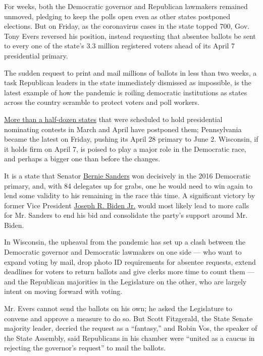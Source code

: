 For weeks, both the Democratic governor and Republican lawmakers
remained unmoved, pledging to keep the polls open even as other states
postponed elections. But on Friday, as the coronavirus cases in the
state topped 700, Gov. Tony Evers reversed his position, instead
requesting that absentee ballots be sent to every one of the state's 3.3
million registered voters ahead of its April 7 presidential primary.

The sudden request to print and mail millions of ballots in less than
two weeks, a task Republican leaders in the state immediately dismissed
as impossible, is the latest example of how the pandemic is roiling
democratic institutions as states across the country scramble to protect
voters and poll workers.

\href{https://www.nytimes3xbfgragh.onion/article/2020-campaign-primary-calendar-coronavirus.html}{More
than a half-dozen states} that were scheduled to hold presidential
nominating contests in March and April have postponed them; Pennsylvania
became the latest on Friday, pushing its April 28 primary to June 2.
Wisconsin, if it holds firm on April 7, is poised to play a major role
in the Democratic race, and perhaps a bigger one than before the
changes.

It is a state that Senator
\href{https://www.nytimes3xbfgragh.onion/interactive/2020/us/elections/bernie-sanders.html}{Bernie
Sanders} won decisively in the 2016 Democratic primary, and, with 84
delegates up for grabs, one he would need to win again to lend some
validity to his remaining in the race this time. A significant victory
by former Vice President
\href{https://www.nytimes3xbfgragh.onion/interactive/2020/us/elections/joe-biden.html}{Joseph
R. Biden Jr.} would most likely lead to more calls for Mr. Sanders to
end his bid and consolidate the party's support around Mr. Biden.

In Wisconsin, the upheaval from the pandemic has set up a clash between
the Democratic governor and Democratic lawmakers on one side --- who
want to expand voting by mail, drop photo ID requirements for absentee
requests, extend deadlines for voters to return ballots and give clerks
more time to count them --- and the Republican majorities in the
Legislature on the other, who are largely intent on moving forward with
voting.

Mr. Evers cannot send the ballots on his own; he asked the Legislature
to convene and approve a measure to do so. But Scott Fitzgerald, the
State Senate majority leader, decried the request as a ``fantasy,'' and
Robin Vos, the speaker of the State Assembly, said Republicans in his
chamber were ``united as a caucus in rejecting the governor's request''
to mail the ballots.

